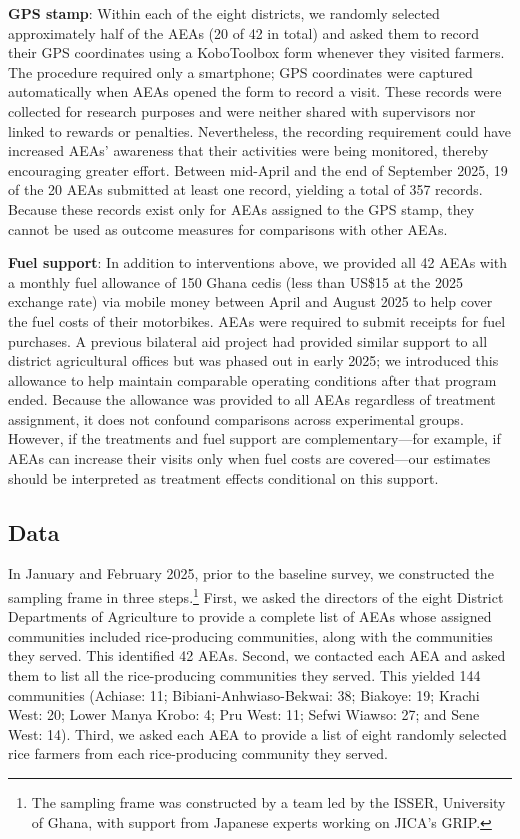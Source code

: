\documentclass[11pt]{article}
\begin{document}
\textbf{GPS stamp}: Within each of the eight districts, we randomly selected approximately half of the AEAs (20 of 42 in total) and asked them to record their GPS coordinates using a KoboToolbox form whenever they visited farmers. The procedure required only a smartphone; GPS coordinates were captured automatically when AEAs opened the form to record a visit. These records were collected for research purposes and were neither shared with supervisors nor linked to rewards or penalties. Nevertheless, the recording requirement could have increased AEAs' awareness that their activities were being monitored, thereby encouraging greater effort. Between mid-April and the end of September 2025, 19 of the 20 AEAs submitted at least one record, yielding a total of 357 records. Because these records exist only for AEAs assigned to the GPS stamp, they cannot be used as outcome measures for comparisons with other AEAs.
 
\textbf{Fuel support}: In addition to interventions above, we provided all 42 AEAs with a monthly fuel allowance of 150 Ghana cedis (less than US\$15 at the 2025 exchange rate) via mobile money between April and August 2025 to help cover the fuel costs of their motorbikes. AEAs were required to submit receipts for fuel purchases. A previous bilateral aid project had provided similar support to all district agricultural offices but was phased out in early 2025; we introduced this allowance to help maintain comparable operating conditions after that program ended. Because the allowance was provided to all AEAs regardless of treatment assignment, it does not confound comparisons across experimental groups. However, if the treatments and fuel support are complementary---for example, if AEAs can increase their visits only when fuel costs are covered---our estimates should be interpreted as treatment effects conditional on this support.

\subsection{Data}

In January and February 2025, prior to the baseline survey, we constructed the sampling frame in three steps.\footnote{
The sampling frame was constructed by a team led by
the ISSER, University of Ghana, with support from Japanese experts working on JICA's
GRIP.} First, we asked the directors of the eight District Departments of Agriculture to provide a complete list of AEAs whose assigned communities included rice-producing communities, along with the communities they served. This identified 42 AEAs. Second, we contacted each AEA and asked them to list all the rice-producing communities they served. This yielded 144 communities (Achiase: 11; Bibiani-Anhwiaso-Bekwai: 38; Biakoye: 19; Krachi West: 20; Lower Manya Krobo: 4; Pru West: 11; Sefwi Wiawso: 27; and Sene West: 14). Third, we asked each AEA to provide a list of eight randomly selected rice farmers from each rice-producing community they served. 
\end{document}
